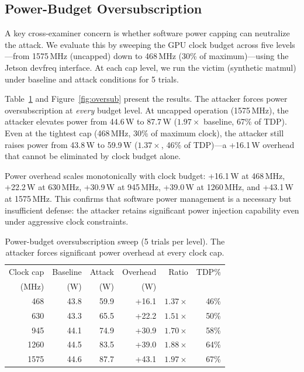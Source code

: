 \documentclass[letterpaper,twocolumn,10pt]{article}
\begin{document}
\subsection{Power-Budget Oversubscription}
\label{sec:oversubscription}
\label{sec:eval-oversub}

A key cross-examiner concern is whether software power capping can
neutralize the attack.  We evaluate this by sweeping the GPU clock
budget across five levels---from 1575\,MHz (uncapped) down to
468\,MHz (30\% of maximum)---using the Jetson devfreq interface.
At each cap level, we run the victim (synthetic matmul) under
baseline and attack conditions for 5 trials.

Table~\ref{tab:oversubscription} and Figure~\ref{fig:oversub} present
the results.  The attacker forces power oversubscription at
\emph{every} budget level.  At uncapped operation (1575\,MHz), the
attacker elevates power from 44.6\,W to 87.7\,W
($1.97\times$ baseline, 67\% of TDP).  Even at the tightest cap
(468\,MHz, 30\% of maximum clock), the attacker still raises power
from 43.8\,W to 59.9\,W ($1.37\times$, 46\% of TDP)---a
+16.1\,W overhead that cannot be eliminated by clock budget alone.

Power overhead scales monotonically with clock budget:
+16.1\,W at 468\,MHz, +22.2\,W at 630\,MHz, +30.9\,W at 945\,MHz,
+39.0\,W at 1260\,MHz, and +43.1\,W at 1575\,MHz.
This confirms that software power management is a necessary but
insufficient defense: the attacker retains significant power
injection capability even under aggressive clock constraints.

\begin{table}[t]
\centering\small
\caption{Power-budget oversubscription sweep (5 trials per level).
The attacker forces significant power overhead at every clock cap.}
\label{tab:oversubscription}
\begin{tabular}{rrrrrr}
\toprule
Clock cap & Baseline & Attack & Overhead & Ratio & TDP\% \\
(MHz) & (W) & (W) & (W) & & \\
\midrule
468  & 43.8 & 59.9 & +16.1 & $1.37\times$ & 46\% \\
630  & 43.3 & 65.5 & +22.2 & $1.51\times$ & 50\% \\
945  & 44.1 & 74.9 & +30.9 & $1.70\times$ & 58\% \\
1260 & 44.5 & 83.5 & +39.0 & $1.88\times$ & 64\% \\
1575 & 44.6 & 87.7 & +43.1 & $1.97\times$ & 67\% \\
\bottomrule
\end{tabular}
\end{table}
\end{document}
